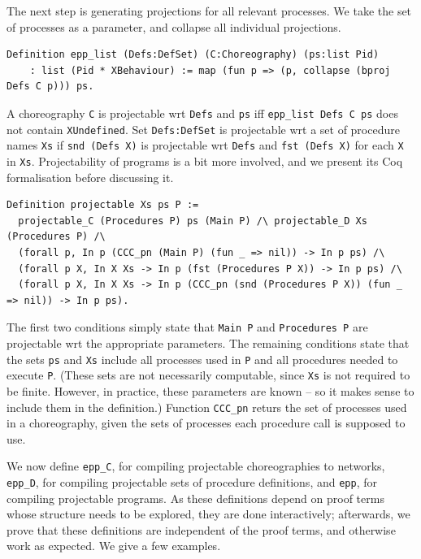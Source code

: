 \documentclass[runningheads]{llncs}
\begin{document}
The next step is generating projections for all relevant processes.
We take the set of processes as a parameter, and collapse all individual projections.
\begin{lstlisting}
Definition epp_list (Defs:DefSet) (C:Choreography) (ps:list Pid)
	: list (Pid * XBehaviour) := map (fun p => (p, collapse (bproj Defs C p))) ps.
\end{lstlisting}

A choreography \lstinline+C+ is projectable wrt \lstinline+Defs+ and \lstinline+ps+ iff
\lstinline+epp_list Defs C ps+ does not contain \lstinline+XUndefined+.
Set \lstinline+Defs:DefSet+ is projectable wrt a set of procedure names \lstinline+Xs+ if
\lstinline+snd (Defs X)+ is projectable wrt \lstinline+Defs+ and \lstinline+fst (Defs X)+ for each
\lstinline+X+ in \lstinline+Xs+.
Projectability of programs is a bit more involved, and we present its Coq formalisation before discussing it.
\begin{lstlisting}
Definition projectable Xs ps P :=
  projectable_C (Procedures P) ps (Main P) /\ projectable_D Xs (Procedures P) /\
  (forall p, In p (CCC_pn (Main P) (fun _ => nil)) -> In p ps) /\
  (forall p X, In X Xs -> In p (fst (Procedures P X)) -> In p ps) /\
  (forall p X, In X Xs -> In p (CCC_pn (snd (Procedures P X)) (fun _ => nil)) -> In p ps).
\end{lstlisting}
The first two conditions simply state that \lstinline+Main P+ and \lstinline+Procedures P+ are
projectable wrt the appropriate parameters.
The remaining conditions state that the sets \lstinline+ps+ and \lstinline+Xs+ include all processes
used in \lstinline+P+ and all procedures needed to execute \lstinline+P+.
(These sets are not necessarily computable, since \lstinline+Xs+ is not required to be finite.
However, in practice, these parameters are known -- so it makes sense to include them in the
definition.)
Function \lstinline+CCC_pn+ returs the set of processes used in a choreography, given the sets of
processes each procedure call is supposed to use.

We now define \lstinline+epp_C+, for compiling projectable choreographies to networks, \lstinline+epp_D+, for compiling projectable sets of procedure definitions, and \lstinline+epp+, for compiling projectable programs.
As these definitions depend on proof terms whose structure needs to be explored, they are done
interactively; afterwards, we prove that these definitions are independent of the proof terms, and otherwise work as expected.
We give a few examples.
\end{document}
